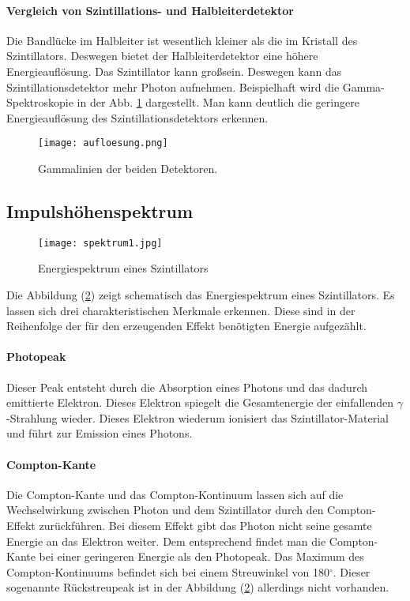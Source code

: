 \documentclass[ngerman,11pt]{article}
\begin{document}
\begin{multicols}{2}
		\paragraph{Vergleich von Szintillations- und Halbleiterdetektor}
		Die Bandl\"ucke im Halbleiter ist wesentlich kleiner als die im Kristall des Szintillators. Deswegen bietet der Halbleiterdetektor eine h\"ohere Energieaufl\"osung. Das Szintillator kann gro\ss sein. Deswegen kann das Szintillationsdetektor mehr Photon aufnehmen. Beispielhaft wird die
		 Gamma-Spektroskopie in der Abb. \ref{aufloesung} dargestellt. Man kann deutlich die geringere Energieaufl\"osung des Szintillationsdetektors erkennen.
		\begin{figure}[H]
			\centering
			\texttt{[image: aufloesung.png]}
			\caption{Gammalinien der beiden Detektoren. \cite{techniques}}
			\label{aufloesung}
		\end{figure} 
		\subsection{Impulshöhenspektrum}

		\begin{figure}[H]
			\centering
			\texttt{[image: spektrum1.jpg]}
			\caption{Energiespektrum eines Szintillators \cite{teilchen}}
			\label{spektrum}
		\end{figure}

		Die Abbildung (\ref{spektrum}) zeigt schematisch das Energiespektrum eines Szintillators. Es lassen sich drei charakteristischen Merkmale erkennen. Diese sind in der Reihenfolge der für den erzeugenden Effekt benötigten Energie aufgezählt.
		\paragraph{Photopeak}
		Dieser Peak entsteht durch die Absorption eines Photons und das dadurch emittierte Elektron. Dieses Elektron spiegelt die Gesamtenergie der einfallenden $\gamma$-Strahlung wieder. Dieses Elektron wiederum ionisiert das Szintillator-Material und führt zur Emission eines Photons.
		\paragraph{Compton-Kante}
		Die Compton-Kante und das Compton-Kontinuum lassen sich auf die Wechselwirkung zwischen Photon und dem Szintillator durch den Compton-Effekt zurückführen. Bei diesem Effekt gibt das Photon nicht seine gesamte Energie an das Elektron weiter. Dem entsprechend findet man die Compton-Kante bei einer geringeren Energie als den Photopeak. Das Maximum des Compton-Kontinuums befindet sich bei einem Streuwinkel von 180$^\circ$. Dieser sogenannte Rückstreupeak ist in der Abbildung (\ref{spektrum}) allerdings nicht vorhanden.

\end{multicols}
\end{document}
